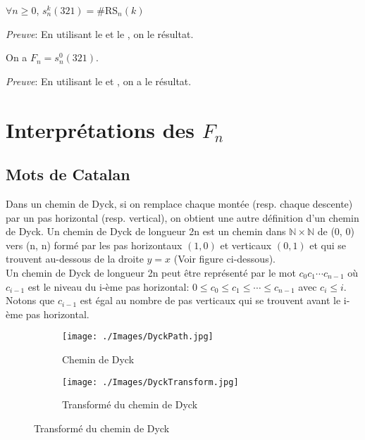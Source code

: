 \begin{corollaire} \label{avoiding_321_and_SR_n}
	$\forall n\geq 0$, $s_{n}^{k}(321)=\#$\rm{RS}$_{n}(k)$
\end{corollaire}
\textit{Preuve}:
En utilisant le  et le , on le résultat.

\begin{corollaire} \label{fn_and_avoiding_321_without_fix}
	On a $F_{n} = s_{n}^{0}(321)$.
\end{corollaire}
\textit{Preuve}:
En utilisant le  et , on a le résultat.

\section{Interprétations des $F_{n}$}
\subsection{Mots de Catalan}
Dans un chemin de Dyck, si on remplace chaque montée (resp. chaque descente) par un pas horizontal (resp. vertical), on obtient une autre définition d’un chemin de Dyck. Un chemin de Dyck de longueur 2n est un chemin dans $\mathbb{N}\times \mathbb{N}$ de (0, 0) vers (n, n) formé par les pas horizontaux $(1, 0)$ et verticaux $(0, 1)$ et qui se trouvent au-dessous de la droite $y = x$ (Voir figure ci-dessous).\\Un chemin de Dyck de longueur 2n peut être représenté par le mot $c_{0}c_{1} \cdots c_{n-1}$ où $c_{i-1}$ est le niveau du i-ème pas horizontal: $0 \leq c_{0} \leq c_{1} \leq \cdots \leq c_{n-1}$ avec $c_{i} \leq i$. Notons que $c_{i-1}$ est égal au nombre de pas verticaux qui se trouvent avant le i-ème pas horizontal.\vspace{15pt}

\begin{figure}[h!]
	\centering
	\begin{subfigure}[b]{0.38\textwidth}
		\centering
		\texttt{[image: ./Images/DyckPath.jpg]}
		\caption{Chemin de Dyck}
	\end{subfigure}
	\hspace{2cm}
	\begin{subfigure}[b]{0.38\textwidth}
		\centering
		\texttt{[image: ./Images/DyckTransform.jpg]}
		\caption{Transformé du chemin de Dyck}
	\end{subfigure}
	\label{fig:DyckPath}
\end{figure}

